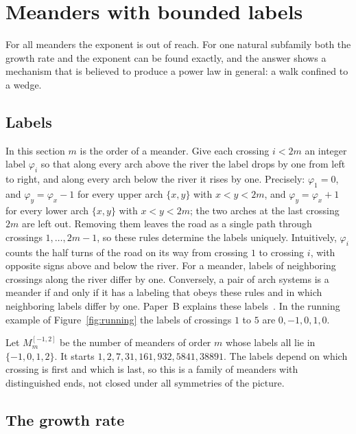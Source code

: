 \section{Meanders with bounded labels}\label{sec:band}

For all meanders the exponent is out of reach. For one natural subfamily both the growth rate and the
exponent can be found exactly, and the answer shows a mechanism that is believed to produce a power
law in general: a walk confined to a wedge.

\subsection{Labels}

In this section $m$ is the order of a meander. Give each crossing $i<2m$ an integer label $\varphi_i$
so that along every arch above the river the label drops by one from left to right, and along every
arch below the river it rises by one. Precisely: $\varphi_1=0$, and $\varphi_y=\varphi_x-1$ for every
upper arch $\{x,y\}$ with $x<y<2m$, and $\varphi_y=\varphi_x+1$ for every lower arch $\{x,y\}$ with
$x<y<2m$; the two arches at the last crossing $2m$ are left out. Removing them leaves the road as a
single path through crossings $1,\ldots,2m-1$, so these rules determine the labels uniquely.
Intuitively, $\varphi_i$ counts the half turns of the road on its way from crossing $1$ to crossing
$i$, with opposite signs above and below the river. For a meander, labels of neighboring crossings
along the river differ by one. Conversely, a pair of arch systems is a meander if and only if it has a
labeling that obeys these rules and in which neighboring labels differ by one. Paper~B explains these
labels~\cite{PaperB}. In the running example of Figure~\ref{fig:running} the labels of crossings $1$
to $5$ are $0,-1,0,1,0$.

Let $M^{[-1,2]}_m$ be the number of meanders of order $m$ whose labels all lie in $\{-1,0,1,2\}$. It
starts $1,2,7,31,161,932,5841,38891$. The labels depend on which crossing is first and which is last,
so this is a family of meanders with distinguished ends, not closed under all symmetries of the
picture.

\subsection{The growth rate}


